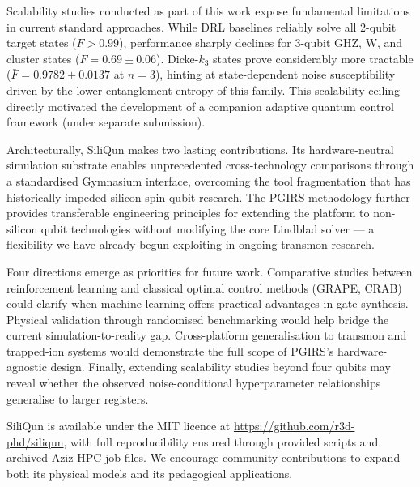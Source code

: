 Scalability studies conducted as part of this work expose fundamental limitations in current standard approaches. While DRL baselines reliably solve all 2-qubit target states ($F > 0.99$), performance sharply declines for 3-qubit GHZ, W, and cluster states ($\bar{F} = 0.69 \pm 0.06$). Dicke-$k_3$ states prove considerably more tractable ($\bar{F} = 0.9782 \pm 0.0137$ at $n=3$), hinting at state-dependent noise susceptibility driven by the lower entanglement entropy of this family. This scalability ceiling directly motivated the development of a companion adaptive quantum control framework (under separate submission).

Architecturally, SiliQun makes two lasting contributions. Its hardware-neutral simulation substrate enables unprecedented cross-technology comparisons through a standardised Gymnasium interface, overcoming the tool fragmentation that has historically impeded silicon spin qubit research. The PGIRS methodology further provides transferable engineering principles for extending the platform to non-silicon qubit technologies without modifying the core Lindblad solver — a flexibility we have already begun exploiting in ongoing transmon research.

Four directions emerge as priorities for future work. Comparative studies between reinforcement learning and classical optimal control methods (GRAPE, CRAB) could clarify when machine learning offers practical advantages in gate synthesis. Physical validation through randomised benchmarking would help bridge the current simulation-to-reality gap. Cross-platform generalisation to transmon and trapped-ion systems would demonstrate the full scope of PGIRS's hardware-agnostic design. Finally, extending scalability studies beyond four qubits may reveal whether the observed noise-conditional hyperparameter relationships generalise to larger registers.

SiliQun is available under the MIT licence at \url{https://github.com/r3d-phd/siliqun}, with full reproducibility ensured through provided scripts and archived Aziz HPC job files. We encourage community contributions to expand both its physical models and its pedagogical applications.

